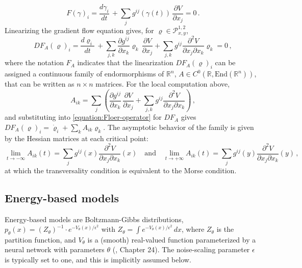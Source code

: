 \documentclass[12pt]{article}
\begin{document}
\begin{equation*}
    F(\gamma)_i = \frac{d\gamma_i}{dt} \,  + \sum_{j} g^{ij}(\gamma(t)) \, \frac{\partial V}{\partial x_j} = 0 \,.
\end{equation*}
Linearizing the gradient flow equation gives, for $\varrho \in \mathcal{P}^{1,2}_{x,y}$,
\begin{equation}
\label{equation:Floer-operator}
    DF_A(\varrho)_i = \frac{d\varrho_i}{dt} \,  + \sum_{j,k} \frac{\partial g^{ij}}{\partial x_k} \varrho_k \, \frac{\partial V}{\partial x_j} + \sum_{j,k} g^{ij} \frac{\partial^2 V}{\partial x_j \partial x_k}\varrho_k = 0 \, ,
\end{equation}
where the notation $F_A$ indicates that the linearization $DF_A(\varrho)_i$ can be assigned a continuous family of endormorphisms of $\mathbb{R}^n$, $A \in C^0({\mathbb{R}},\text{End}(\mathbb{R}^n))$, that can be written as $n \times n$ matrices. For the local computation above,
\begin{equation*}
    A_{ik} = \sum_{j} \left( \frac{\partial g^{ij}}{\partial x_k} \, \frac{\partial V}{\partial x_j} + \sum_{j,k} g^{ij} \frac{\partial^2 V}{\partial x_j \partial x_k} \right) \, ,
\end{equation*}
and substituting into \eqref{equation:Floer-operator} for $DF_A$ gives $DF_A(\varrho)_i = \dot{\varrho}_i + \sum_k A_{ik} \varrho_k$. The asymptotic behavior of the family is given by the Hessian matrices at each critical point:
\begin{equation*}
    \lim_{t\rightarrow -\infty} A_{ik}(t) = \sum_{j} g^{ij}(x) \frac{\partial^2 V}{\partial x_j \partial x_k} (x) \hspace{1em} \text{and} \hspace{1em} \lim_{t\rightarrow +\infty} A_{ik}(t) = \sum_{j} g^{ij}(y) \frac{\partial^2 V}{\partial x_j \partial x_k} (y) \, ,
\end{equation*}
at which the transversality condition is equivalent to the Morse condition.


\subsection{Energy-based models}
\label{subsection:applications-energy-based-models}
Energy-based models are Boltzmann-Gibbs distributions, ${p_{\theta}(x)=({Z_{\theta}})^{-1} \cdot e^{{-V_{\theta}(x)}/{\epsilon^2}}}$ with $Z_{\theta} = \int e^{{-V_{\theta}(x)}/{\epsilon^2}} \, dx$, where $Z_{\theta}$ is the partition function, and $V_{\theta}$ is a (smooth) real-valued function parameterized by a neural network with parameters $\theta$ (\cite{pml2Book}, Chapter 24). The noise-scaling parameter $\epsilon$ is typically set to one, and this is implicitly assumed below.
\end{document}
